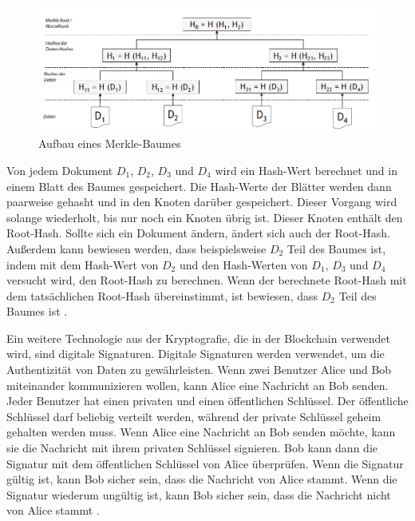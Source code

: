 \begin{figure}[H]
    \centering
    \includegraphics[width=0.9\linewidth]{images/merkle_tree.png}
    \caption{Aufbau eines Merkle-Baumes \parencite[S. 8]{Fill_BlockchainGrundlagen}}
    \label{fig:merkle_tree}
\end{figure}

\noindent Von jedem Dokument $D_{1}$, $D_{2}$, $D_{3}$ und $D_{4}$ wird ein Hash-Wert berechnet und in einem Blatt des Baumes gespeichert. Die Hash-Werte der Blätter werden dann paarweise gehasht und in den Knoten darüber gespeichert. Dieser Vorgang wird solange wiederholt, bis nur noch ein Knoten übrig ist. Dieser Knoten enthält den Root-Hash. Sollte sich ein Dokument ändern, ändert sich auch der Root-Hash. Außerdem kann bewiesen werden, dass beispielsweise $D_{2}$ Teil des Baumes ist, indem mit dem Hash-Wert von $D_{2}$ und den Hash-Werten von $D_{1}$, $D_{3}$ und $D_{4}$ versucht wird, den Root-Hash zu berechnen. Wenn der berechnete Root-Hash mit dem tatsächlichen Root-Hash übereinstimmt, ist bewiesen, dass $D_{2}$ Teil des Baumes ist \parencite[S. 9]{Fill_BlockchainGrundlagen}.

Ein weitere Technologie aus der Kryptografie, die in der Blockchain verwendet wird, sind digitale Signaturen. Digitale Signaturen werden verwendet, um die Authentizität von Daten zu gewährleisten. Wenn zwei Benutzer Alice und Bob miteinander kommunizieren wollen, kann Alice eine Nachricht an Bob senden. Jeder Benutzer hat einen privaten und einen öffentlichen Schlüssel. Der öffentliche Schlüssel darf beliebig verteilt werden, während der private Schlüssel geheim gehalten werden muss. Wenn Alice eine Nachricht an Bob senden möchte, kann sie die Nachricht mit ihrem privaten Schlüssel signieren. Bob kann dann die Signatur mit dem öffentlichen Schlüssel von Alice überprüfen. Wenn die Signatur gültig ist, kann Bob sicher sein, dass die Nachricht von Alice stammt. Wenn die Signatur wiederum ungültig ist, kann Bob sicher sein, dass die Nachricht nicht von Alice stammt \parencite[S. 9-10]{Fill_BlockchainGrundlagen}.


